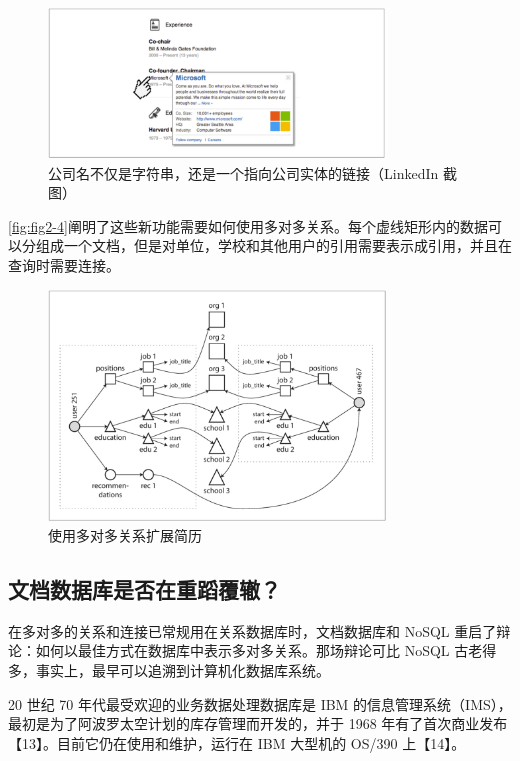 \begin{figure}
    \centering
    \includegraphics[width=0.8\textwidth]{img/fig2-3.png}
    \caption{公司名不仅是字符串，还是一个指向公司实体的链接（LinkedIn 截图）}
    \label{fig:fig2-3}
\end{figure}

\autoref{fig:fig2-4}阐明了这些新功能需要如何使用多对多关系。每个虚线矩形内的数据可以分组成一个文档，但是对单位，学校和其他用户的引用需要表示成引用，并且在查询时需要连接。

\begin{figure}
    \centering
    \includegraphics[width=0.8\textwidth]{img/fig2-4.png}
    \caption{使用多对多关系扩展简历}
    \label{fig:fig2-4}
\end{figure}

\subsection{文档数据库是否在重蹈覆辙？}

在多对多的关系和连接已常规用在关系数据库时，文档数据库和 NoSQL 重启了辩论：如何以最佳方式在数据库中表示多对多关系。那场辩论可比 NoSQL 古老得多，事实上，最早可以追溯到计算机化数据库系统。

20 世纪 70 年代最受欢迎的业务数据处理数据库是 IBM 的信息管理系统（IMS），最初是为了阿波罗太空计划的库存管理而开发的，并于 1968 年有了首次商业发布【13】。目前它仍在使用和维护，运行在 IBM 大型机的 OS/390 上【14】。

